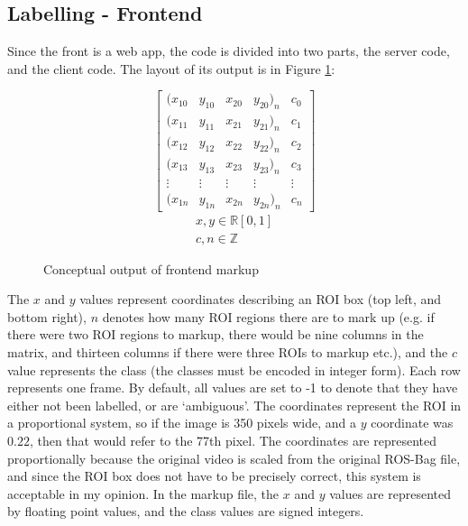     \subsection{Labelling - Frontend}
    Since the front is a web app, the code is divided into two parts, the server code, and the client code. The layout of its output is in Figure \ref{fig:frontend_output}:
    \begin{figure}[h]
        \centering
    \[
    \begin{bmatrix}
    (x_{10} & y_{10} & x_{20} & y_{20})_n & c_{0} \\
    (x_{11} & y_{11} & x_{21} & y_{21})_n & c_{1} \\
    (x_{12} & y_{12} & x_{22} & y_{22})_n & c_{2} \\
    (x_{13} & y_{13} & x_{23} & y_{23})_n & c_{3} \\
     \vdots & \vdots & \vdots & \vdots    & \vdots\\
    (x_{1n} & y_{1n} & x_{2n} & y_{2n})_n & c_{n} 
    \end{bmatrix}
    \]
    \begin{gather*}
    x, y \in \mathbb{R} [0, 1]\\
    c, n \in \mathbb{Z}
    \end{gather*}
    \caption{Conceptual output of frontend markup}
    \label{fig:frontend_output}
\end{figure}

    The $x$ and $y$ values represent coordinates describing an ROI box (top left, and bottom right), $n$ denotes how many ROI regions there are  to mark up (e.g. if there were two ROI regions to markup, there would be nine columns in the matrix, and thirteen columns if there were three ROIs to markup etc.), and the $c$ value represents the class (the classes must be encoded in integer form). Each row represents one frame. By default, all values are set to -1 to denote that they have either not been labelled, or are `ambiguous'. The coordinates represent the ROI in a proportional system, so if the image is 350 pixels wide, and a $y$ coordinate was $0.22$, then that would refer to the 77th pixel. The coordinates are represented proportionally because the original video is scaled from the original ROS-Bag file, and since the ROI box does not have to be precisely correct, this system is acceptable in my opinion. In the markup file, the $x$ and $y$ values are represented by floating point values, and the class values are signed integers.

